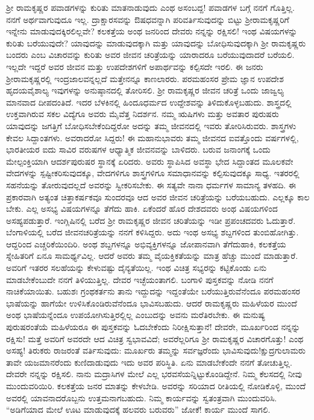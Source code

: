 ಶ‍್ರೀ ರಾಮಕೃಷ್ಣರ ಪವಾಡಗಳನ್ನು ಕುರಿತು ಮಾತನಾಡುವುದು ಎಂಥ ಅಸಂಬದ್ದ! ಪವಾಡಗಳ ಬಗ್ಗೆ ನನಗೆ ಗೊತ್ತಿಲ್ಲ. ನನಗೆ ಅರ್ಥವಾಗುವುದೂ ಇಲ್ಲ. ದ್ರಾಕ್ಷಾರಸವನ್ನು ಔಷಧವನ್ನಾಗಿ ಪರಿವರ್ತಿಸುವುದನ್ನು ಬಿಟ್ಟು ಶ‍್ರೀರಾಮಕೃಷ್ಣರಿಗೆ ಇನ್ನೇನು ಮಾಡುವುದಕ್ಕಿರಲಿಲ್ಲವೇ? ಕಲಕತ್ತೆಯ ಅಂಥ ಜನರಿಂದ ದೇವರು ನನ್ನನ್ನು ರಕ್ಷಿಸಲಿ! ಇಂಥ ವಿಷಯಗಳನ್ನು ಕುರಿತು ಬರೆಯುವುದೇ? ಯಾವುದನ್ನು ಮಾಡುವುದಕ್ಕಾಗಿ ಮತ್ತು ಯಾವುದನ್ನು ಬೋಧಿಸುವುದಕ್ಕಾಗಿ ಶ‍್ರೀ ರಾಮಕೃಷ್ಣರು ಬಂದರು ಎಂಬ ವಿಚಾರವನ್ನು ಕುರಿತು ಅವರ ಜೀವನ ಚರಿತ್ರೆಯನ್ನು ಯಾರಾದರೂ ಬರೆಯುವುದಾದರೆ ಬರೆಯಲಿ. ಇಲ್ಲದೇ ಇದ್ದರೆ ಅವರ ಜೀವನ ಮತ್ತು ಉಪದೇಶಗಳಿಗೆ ಅಪಾರ್ಥವನ್ನು ಕಲ್ಪಿಸದೇ ಇರಲಿ. ಈ ಜನರು ಶ‍್ರೀರಾಮಕೃಷ್ಣರಲ್ಲಿ ಇಂದ್ರಜಾಲವನ್ನಲ್ಲದೆ ಮತ್ತೇನನ್ನೂ ಕಾಣಲಾರರು. ಪರಮಹಂಸರ ಪ್ರೇಮ ಜ್ಞಾನ ಉಪದೇಶ ಹೃದಯವೈಶಾಲ್ಯ ಇವುಗಳನ್ನು ಅನುಷ್ಠಾನದಲ್ಲಿ ತೋರಿಸಲಿ. ಶ‍್ರೀ ರಾಮಕೃಷ್ಣರ ಜೀವನ ಚರಿತ್ರೆ ಒಂದು ಜಾಜ್ವಲ್ಯ ಮಾನವಾದ ದೀಪದಂತಿದೆ. ಇದರ ಬೆಳಕಿನಲ್ಲಿ ಹಿಂದೂಧರ್ಮದ ಉದ್ದೇಶವನ್ನು ತಿಳಿದುಕೊಳ್ಳಬಹುದು. ಶಾಸ್ತ್ರದಲ್ಲಿ ಉಕ್ತವಾಗಿರುವ ಸಕಲ ವಿದ್ಯೆಗೂ ಅವರು ಮೈವೆತ್ತ ನಿದರ್ಶನ. ನಮ್ಮ ಋಷಿಗಳು ಮತ್ತು ಅವತಾರ ಪುರುಷರು ಯಾವುದನ್ನು ಜಗತ್ತಿಗೆ ಬೋಧಿಸಬೇಕೆಂದಿದ್ದರೋ ಅದನ್ನು ತಮ್ಮ ಜೀವನದಲ್ಲಿ ಇವರು ತೋರಿಸಿರುವರು. ಶಾಸ್ತ್ರಗಳು ಕೇವಲ ಸಿದ್ದಾಂತಗಳು. ಅವರಾದರೋ ಸಿದ್ದರು! ಈ ಮಹಾನುಭಾವರು ತಮ್ಮ ಜೀವನದ ಐವತ್ತೊಂದು ವರ್ಷಗಳಲ್ಲಿ, ಭಾರತೀಯರ ಐದು ಸಾವಿರ ವರುಷಗಳ ಆಧ್ಯಾತ್ಮಿಕ ಜೀವನವನ್ನು ಬಾಳಿದರು. ಬರುವ ಜನಾಂಗಕ್ಕೆ ಒಂದು ಮೇಲ್ಪಂಕ್ತಿಯಾಗಿ ಆದರ್ಶಪುರುಷರ ಸ್ಥಾನಕ್ಕೆ ಏರಿದರು. ಅವರು ಸ್ಥಾಪಿಸಿದ ಅವಸ್ಥಾ ಭೇದ ಸಿದ್ದಾಂತದ ಮೂಲಕವೇ ವೇದಗಳನ್ನು ಸ್ಪಷ್ಟೀಕರಿಸುವುದಕ್ಕೂ, ವೇದಗಳಿಗೂ ಶಾಸ್ತ್ರಗಳಿಗೂ ಸಮಾಧಾನವನ್ನು ಕಲ್ಪಿಸುವುದಕ್ಕೂ ಸಾಧ್ಯ. ಇತರರಲ್ಲಿ ಸಹನೆಯನ್ನು ತೋರುವುದಲ್ಲದೆ ಅವರನ್ನು ಸ್ವೀಕರಿಸಬೇಕು. ಈ ಸತ್ಯವೇ ನಾನಾ ಧರ್ಮಗಳ ಸಾಮಾನ್ಯ ತಳಹದಿ. ಈ ಪ್ರಕಾರವಾಗಿ ಅತ್ಯಂತ ಚಿತ್ತಾಕರ್ಷಕವೂ ಸುಂದರವೂ ಆದ ಅವರ ಜೀವನ ಚರಿತ್ರೆಯನ್ನು ಬರೆಯಬಹುದು. ಎಲ್ಲಕ್ಕೂ ಕಾಲ ಬೇಕು. ಎಲ್ಲ ಅಸಭ್ಯ ವಿಷಯಗಳನ್ನೂ ತೆಗೆದು ಹಾಕಿ. ಏಕೆಂದರೆ ಹೊರ ದೇಶದವರು ಅಂಥ ವಿಷಯಗಳಿಂದ ಅಸಹ್ಯಪಡುತ್ತಾರೆ. ಇಂಗ್ಲಿಷಿನಲ್ಲಿ ಬರೆದ ಶ‍್ರೀ ರಾಮಕೃಷ್ಣರ ಜೀವನ ಚರಿತೆಯನ್ನು ಇಡೀ ಪ್ರಪಂಚದವರು ಓದುತ್ತಾರೆ. ಬೆಂಗಾಳಿಯಲ್ಲಿ ಬರೆದ ಜೀವನಚರಿತ್ರೆಯನ್ನು ನನಗೆ ಕಳಿಸಿದ್ದರು. ಅದು ಇಂಥ ಅಸಭ್ಯ ಶಬ್ದಗಳಿಂದ ತುಂಬಿಹೋಗಿತ್ತು. ಆದ್ದರಿಂದ ಎಚ್ಚರಿಕೆಯಿಂದಿರಿ. ಅಂಥ ಶಬ್ದಗಳನ್ನೂ ಅಭಿವ್ಯಕ್ತಿಗಳನ್ನೂ ಜೋಪಾನವಾಗಿ ತೆಗೆದುಹಾಕಿ, ಕಲಕತ್ತೆಯ ಸ್ನೇಹಿತರಿಗೆ ಏನೂ ಸಾಮರ್ಥ್ಯವಿಲ್ಲ. ಆದರೆ ಅವರು ತಮ್ಮ ವೈಯಕ್ತಿಕತೆಯನ್ನು ಮಾತ್ರ ಹೆಚ್ಚು ಮುಂದೆ ಮಾಡುತ್ತಾರೆ. ಅವರಿಗೆ ಇತರರ ಸಲಹೆಯನ್ನು ಕೇಳುವಷ್ಟು ದೈನ್ಯತೆಯಿಲ್ಲ. ಇಂಥ ವಿಚಿತ್ರ ಸಭ್ಯರನ್ನು ಕಟ್ಟಿಕೊಂಡು ಏನು ಮಾಡಬೇಕೆಂಬುದೇ ನನಗೆ ತಿಳಿಯುತ್ತಿಲ್ಲ. ದೇವರ ಇಚ್ಛೆಯಂತಾಗಲಿ. ಬಂಗಾಳಿ ಪುಸ್ತಕವನ್ನು ನೋಡಿ ನನಗೆ ನಾಚಿಕೆಯಾಯಿತು. ಬಹುಶಃ ಗ್ರಂಥಕರ್ತನು ತಾನು ಇದ್ದುದನ್ನು ಇದ್ದಂತೆಯೇ ಬರೆಯುತ್ತಿರುವೆನೆಂದೂ ಪರಮಹಂಸರ ಭಾಷೆಯನ್ನು ಹಾಗೆಯೇ ಉಳಿಸಿಕೊಂಡಿರುವೆನೆಂದೂ ಭಾವಿಸಬಹುದು. ಆದರೆ ರಾಮಕೃಷ್ಣರು ಮಹಿಳೆಯರ ಮುಂದೆ ಅಂಥ ಭಾಷೆಯನ್ನೆಂದೂ ಉಪಯೋಗಿಸುತ್ತಿರಲ್ಲಿಲ್ಲ ಎಂಬುದನ್ನು ಅವನು ಮರೆತಿರಬೇಕು. ಈ ಮನುಷ್ಯ ಪುರುಷರಂತೆಯೆ ಮಹಿಳೆಯರೂ ಈ ಪುಸ್ತಕವನ್ನು ಓದಬೇಕೆಂದು ನಿರೀಕ್ಷಿಸುತ್ತಾನೆ! ದೇವರೇ, ಮೂರ್ಖರಿಂದ ನನ್ನನ್ನು ರಕ್ಷಿಸು! ಮತ್ತೆ ಅವರಿಗೆ ಅವರದೇ ಆದ ವಿಚಿತ್ರ ಸ್ವಭಾವವಿದೆ; ಅವರೆಲ್ಲರಿಗೂ ಶ‍್ರೀ ರಾಮಕೃಷ್ಣರ ವಿಚಾರಗೊತ್ತು! ಎಂಥ ಅಸಹ್ಯ! ತಿರುಕರು ರಾಜರಂತೆ ವರ್ತಿಸುವುದು: ಮೂರ್ಖರು ತಮ್ಮನ್ನು ಸರ್ವಜ್ಞರೆಂದು ಭಾವಿಸುವುದು!ಕ್ಷುದ್ರಗುಲಾಮರು ತಾವೇ ಯಜಮಾನರೆಂದು ಕುಣಿದಾಡುವುದು ಇದು ಅವರ ಪರಿಸ್ಥಿತಿ. ಏನು ಮಾಡಬೇಕೆಂದೇ ನನಗೆ ತೋಚುತ್ತಿಲ್ಲ. ದೇವರೇ ನನ್ನನ್ನು ರಕ್ಷಿಸಲಿ. ನಾನು ಮದ್ರಾಸಿಗಳ ಮೇಲೆ ಎಲ್ಲ ಭರವಸೆಯನ್ನಿಟ್ಟುಕೊಂಡಿದ್ದೇನೆ. ನಿಮ್ಮ ಕೆಲಸದಲ್ಲಿ ನೀವು ಮುಂದುವರಿಯಿರಿ. ಕಲಕತ್ತೆಯ ಜನರ ಮಾತನ್ನು ಕೇಳಬೇಡಿ. ಅವರನ್ನು ಸರಿಯಾದ ರೀತಿಯಲ್ಲಿ ನೋಡಿಕೊಳ್ಳಿ, ಮುಂದೆ ಅವರಲ್ಲಿ ಯಾವನಾದರೊಬ್ಬನು ಉತ್ತಮನಾಗಬಹುದು. ನಿಮ್ಮ ಕಾರ್ಯವನ್ನು ಸ್ವತಂತ್ರವಾಗಿ ಮುಂದುವರಿಸಿ. ``ಅಡಿಗೆಯಾದ ಮೇಲೆ ಊಟ ಮಾಡುವುದಕ್ಕೆ ಹಲವರು ಬರುವರು” ಜೋಕೆ! ಕಾರ್ಯ ಮುಂದೆ ಸಾಗಲಿ.

